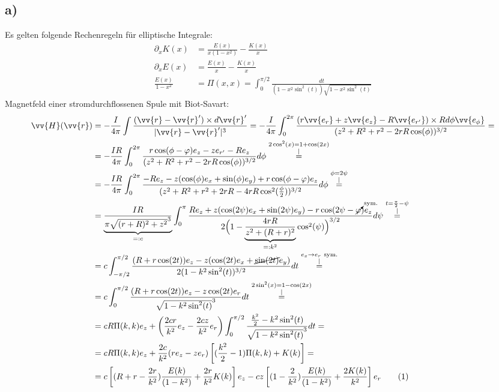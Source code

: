 \documentclass[a4paper,12pt]{article}
\newcommand\numberthis{\addtocounter{equation}{1}\tag{\theequation}}
\begin{document}
\subsection*{a)}
Es gelten folgende Rechenregeln für elliptische Integrale:
\begin{align*}
\partial_xK(x)&=\frac{E(x)}{x(1-x^2)}-\frac{K(x)}{x} \\
\partial_xE(x)&=\frac{E(x)}{x}-\frac{K(x)}{x} \\
\frac{E(x)}{1-x^2}&=\Pi(x,x)=\int_0^{\pi/2}\frac{dt}{(1-x^2\sin^2(t))\sqrt{1-x^2\sin^2(t)}}
\end{align*}
Magnetfeld einer stromdurchflossenen Spule mit Biot-Savart:
\begin{align*}
\vv{H}(\vv{r})&=-\frac{I}{4\pi}\int\frac{(\vv{r}-\vv{r}')\times d\vv{r}'}{|\vv{r}-\vv{r}'|^3} = -\frac{I}{4\pi}\int_0^{2\pi} \frac{(r\vv{e_r}+z\vv{e_z}-R\vv{e_{r'}})\times Rd\phi\vv{e_{\phi}}}{(z^2+R^2+r^2-2rR\cos(\phi))^{3/2}}=\\
&= -\frac{IR}{4\pi}\int_0^{2\pi} \frac{r\cos(\phi-\varphi)e_z-ze_{r'}-Re_z}{(z^2+R^2+r^2-2rR\cos(\phi))^{3/2}}d\phi \overset{\substack{2\cos^2(x)=1+\cos(2x)\\|}}{=} \\
&=-\frac{IR}{4\pi}\int_0^{2\pi} \frac{-Re_z-z(\cos(\phi)e_x+\sin(\phi)e_y)+r\cos(\phi-\varphi)e_z}{(z^2+R^2+r^2+2rR-4rR\cos^2(\frac{\phi}{2}))^{3/2}}d\phi\overset{\substack{ \phi=2\psi \\|}}{=}\\
&=\underbrace{\frac{IR}{\pi\sqrt{(r+R)^2+z^2}^3}}_{=:c}\int_0^{\pi} \frac{Re_z+z(\cos(2\psi)e_x+\sin(2\psi)e_y)-r\cos(2\psi-\cancelto{\mathrm{sym.}}{\varphi})e_z}{2\Big(1-\underbrace{\frac{4rR}{z^2+(R+r)^2}}_{=:k^2}\cos^2(\psi)\Big)^{3/2}}d\psi\overset{\substack{ t=\frac{\pi}{2}-\psi\\|}}{=}\\
&=c\int_{-\pi/2}^{\pi/2}\frac{(R+r\cos(2t))e_z-z(\cos(2t)e_x+\cancel{\sin(2t)}e_y)}{2(1-k^2\sin^2(t))^{3/2}}dt\overset{\substack{ e_x\rightarrow e_r\ \mathrm{sym.}\\|}}{=} \\
&=c\int_0^{\pi/2} \frac{(R+r\cos(2t))e_z-z\cos(2t)e_r}{\sqrt{1-k^2\sin^2(t)}^3}dt\overset{\substack{ 2\sin^2(x)=1-\cos(2x)\\|}}{=} \\  
&=cR\Pi(k,k)e_z+\left(\frac{2cr}{k^2}e_z-\frac{2cz}{k^2}e_r\right)\int_0^{\pi/2}\frac{\frac{k^2}{2}-k^2\sin^2(t)}{\sqrt{1-k^2\sin^2(t)}^3}dt= \\
&=cR\Pi(k,k)e_z+\frac{2c}{k^2}(re_z-ze_r)\left[(\frac{k^2}{2}-1)\Pi(k,k)+K(k)\right]= \\
&=c\left[(R+r-\frac{2r}{k^2})\frac{E(k)}{(1-k^2)}+\frac{2r}{k^2}K(k)\right]e_z-cz\left[(1-\frac{2}{k^2})\frac{E(k)}{(1-k^2)}+\frac{2K(k)}{k^2}\right]e_r   \numberthis\label{Biot-Savart-Spule}
\end{align*}
\end{document}
